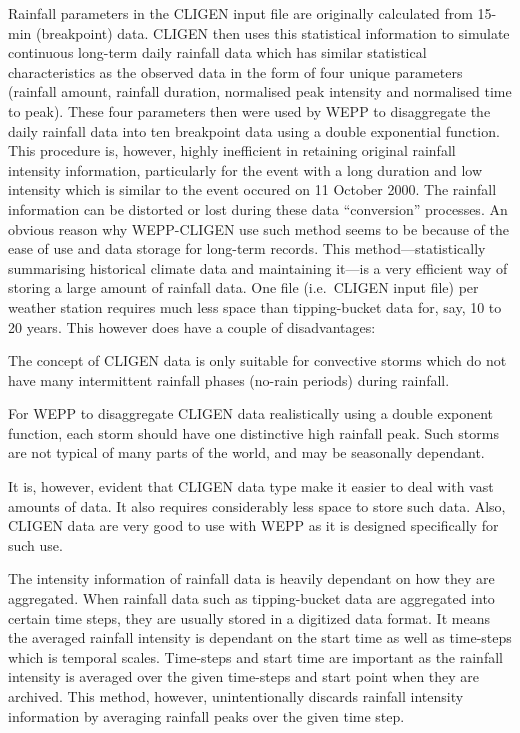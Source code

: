 Rainfall parameters in the CLIGEN input file are originally calculated from
15-min (breakpoint) data. CLIGEN then uses this statistical information to
simulate continuous long-term daily rainfall data which has similar statistical
characteristics as the observed data in the form of four unique parameters
(rainfall amount, rainfall duration, normalised peak intensity and normalised
time to peak). These four parameters then were used by WEPP to disaggregate the
daily rainfall data into ten breakpoint data using a double exponential
function. This procedure is, however, highly inefficient in retaining original
rainfall intensity information, particularly for the event with a long duration
and low intensity which is similar to the event occured on 11 October 2000.
The rainfall information can be distorted or lost during these data
``conversion'' processes. An obvious reason why WEPP-CLIGEN use such
method seems to be because of the ease of use and data storage for long-term
records. This method---statistically summarising historical climate data and
maintaining it---is a very efficient way of storing a large amount of rainfall
data. One file (i.e.\ CLIGEN input file) per weather station requires much less
space than tipping-bucket data for, say, 10 to 20 years. This however does have
a couple of disadvantages:
\begin{enumerate*}
  \item The concept of CLIGEN data is only suitable for convective storms which
do not have many intermittent rainfall phases (no-rain periods) during rainfall.
\medskip
  \item For WEPP to disaggregate CLIGEN data realistically using a double
exponent function, each storm should have one distinctive high rainfall peak.
Such storms are not typical of many parts of the world, and may be seasonally
dependant.
\end{enumerate*}
It is, however, evident that CLIGEN data type make it easier to deal with vast
amounts of data. It also requires considerably less space to store such data.
Also, CLIGEN data are very good to use with WEPP as it is designed specifically
for such use.

The intensity information of rainfall data is heavily dependant on how they are
aggregated. When rainfall data such as tipping-bucket data are aggregated into
certain time steps, they are usually stored in a digitized data format. It means
the averaged rainfall intensity is dependant on the start time as well as
time-steps which is temporal scales. Time-steps and start time are important as
the rainfall intensity is averaged over the given time-steps and start point
when they are archived. This method, however, unintentionally discards rainfall
intensity information by averaging rainfall peaks over the given time step.

